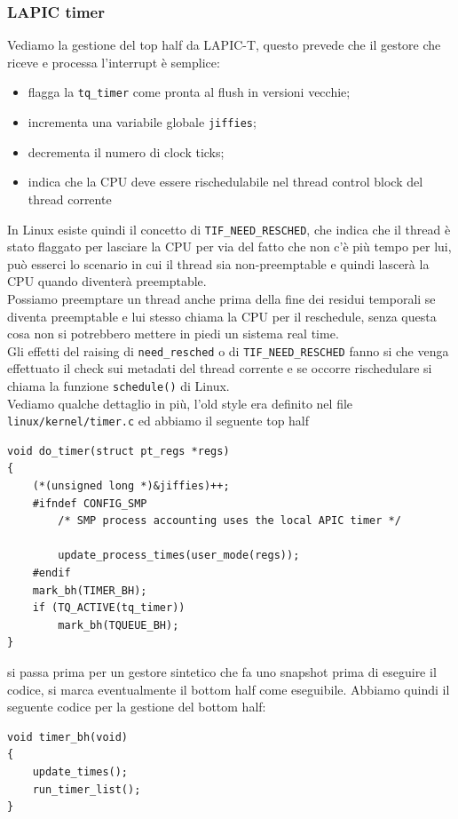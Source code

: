 \documentclass[12pt, oneside]{extbook}
\begin{document}
\subsubsection{LAPIC timer}
Vediamo la gestione del top half da LAPIC-T, questo prevede che il gestore che riceve e processa l'interrupt è semplice:
\begin{itemize}
\item flagga la \texttt{tq\_timer} come pronta al flush in versioni vecchie;
\item incrementa una variabile globale \texttt{jiffies};
\item decrementa il numero di clock ticks;
\item indica che la CPU deve essere rischedulabile nel thread control block del thread corrente
\end{itemize}
In Linux esiste quindi il concetto di \texttt{TIF\_NEED\_RESCHED}, che indica che il thread è stato flaggato per lasciare la CPU per via del fatto che non c'è più tempo per lui, può esserci lo scenario in cui il thread sia non-preemptable e quindi lascerà la CPU quando diventerà preemptable.\\Possiamo preemptare un thread anche prima della fine dei residui temporali se diventa preemptable e lui stesso chiama la CPU per il reschedule, senza questa cosa non si potrebbero mettere in piedi un sistema real time.\\Gli effetti del raising di \texttt{need\_resched} o di \texttt{TIF\_NEED\_RESCHED} fanno si che venga effettuato il check sui metadati del thread corrente e se occorre rischedulare si chiama la funzione \texttt{schedule()} di Linux.\\Vediamo qualche dettaglio in più, l'old style era definito nel file \texttt{linux/kernel/timer.c} ed abbiamo il seguente top half
\begin{lstlisting}
void do_timer(struct pt_regs *regs)
{
	(*(unsigned long *)&jiffies)++;
	#ifndef CONFIG_SMP
		/* SMP process accounting uses the local APIC timer */
		
		update_process_times(user_mode(regs));
	#endif
	mark_bh(TIMER_BH);
	if (TQ_ACTIVE(tq_timer))
		mark_bh(TQUEUE_BH);	
}
\end{lstlisting}
si passa prima per un gestore sintetico che fa uno snapshot prima di eseguire il codice, si marca eventualmente il bottom half come eseguibile. Abbiamo quindi il seguente codice per la gestione del bottom half:
\begin{lstlisting}
void timer_bh(void)
{
	update_times();
	run_timer_list();
}
\end{lstlisting}
\end{document}
